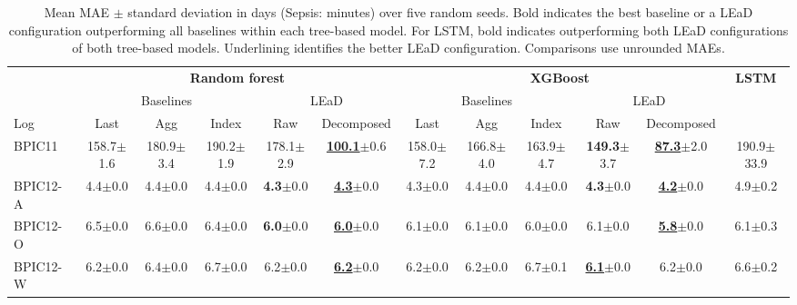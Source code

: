 \begin{table}[t]
\centering
\caption{Mean MAE $\pm$ standard deviation in days (Sepsis: minutes) over five random seeds. Bold indicates the best baseline or a LEaD configuration outperforming all baselines within each tree-based model. For LSTM, bold indicates outperforming both LEaD configurations of both tree-based models. Underlining identifies the better LEaD configuration. Comparisons use unrounded MAEs.}
\label{tab:mae-rf-xgb-lstm}
\fontsize{8}{9.5}\selectfont
\setlength{\tabcolsep}{2pt}
\renewcommand{\arraystretch}{1.14}
\begin{adjustbox}{max width=\textwidth}
\begin{tabular}{@{}lccccc|ccccc|c@{}}
\toprule
 & \multicolumn{5}{c|}{\textbf{Random forest}}
 & \multicolumn{5}{c|}{\textbf{XGBoost}}
 & \textbf{LSTM} \\
\cmidrule{2-6}\cmidrule{7-11}
 & \multicolumn{3}{c}{Baselines}
 & \multicolumn{2}{c|}{LEaD}
 & \multicolumn{3}{c}{Baselines}
 & \multicolumn{2}{c|}{LEaD}
 & \\
\cmidrule(lr){2-4}\cmidrule(lr){5-6}
\cmidrule(lr){7-9}\cmidrule(lr){10-11}
Log & Last & Agg & Index & Raw & Decomposed
    & Last & Agg & Index & Raw & Decomposed & \\
\midrule
BPIC11 & 158.7{\scriptsize$\pm$1.6} & 180.9{\scriptsize$\pm$3.4} & 190.2{\scriptsize$\pm$1.9} & 178.1{\scriptsize$\pm$2.9} & \underline{\textbf{100.1}}{\scriptsize$\pm$0.6} & 158.0{\scriptsize$\pm$7.2} & 166.8{\scriptsize$\pm$4.0} & 163.9{\scriptsize$\pm$4.7} & \textbf{149.3}{\scriptsize$\pm$3.7} & \underline{\textbf{87.3}}{\scriptsize$\pm$2.0} & 190.9{\scriptsize$\pm$33.9} \\
BPIC12-A & 4.4{\scriptsize$\pm$0.0} & 4.4{\scriptsize$\pm$0.0} & 4.4{\scriptsize$\pm$0.0} & \textbf{4.3}{\scriptsize$\pm$0.0} & \underline{\textbf{4.3}}{\scriptsize$\pm$0.0} & 4.3{\scriptsize$\pm$0.0} & 4.4{\scriptsize$\pm$0.0} & 4.4{\scriptsize$\pm$0.0} & \textbf{4.3}{\scriptsize$\pm$0.0} & \underline{\textbf{4.2}}{\scriptsize$\pm$0.0} & 4.9{\scriptsize$\pm$0.2} \\
BPIC12-O & 6.5{\scriptsize$\pm$0.0} & 6.6{\scriptsize$\pm$0.0} & 6.4{\scriptsize$\pm$0.0} & \textbf{6.0}{\scriptsize$\pm$0.0} & \underline{\textbf{6.0}}{\scriptsize$\pm$0.0} & 6.1{\scriptsize$\pm$0.0} & 6.1{\scriptsize$\pm$0.0} & 6.0{\scriptsize$\pm$0.0} & 6.1{\scriptsize$\pm$0.0} & \underline{\textbf{5.8}}{\scriptsize$\pm$0.0} & 6.1{\scriptsize$\pm$0.3} \\
BPIC12-W & 6.2{\scriptsize$\pm$0.0} & 6.4{\scriptsize$\pm$0.0} & 6.7{\scriptsize$\pm$0.0} & 6.2{\scriptsize$\pm$0.0} & \underline{\textbf{6.2}}{\scriptsize$\pm$0.0} & 6.2{\scriptsize$\pm$0.0} & 6.2{\scriptsize$\pm$0.0} & 6.7{\scriptsize$\pm$0.1} & \underline{\textbf{6.1}}{\scriptsize$\pm$0.0} & 6.2{\scriptsize$\pm$0.0} & 6.6{\scriptsize$\pm$0.2} \\

\end{tabular}
\end{adjustbox}
\end{table}
